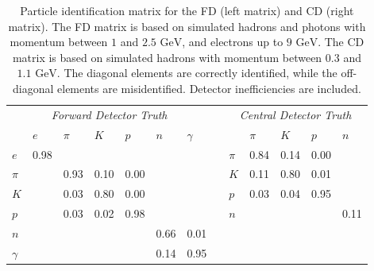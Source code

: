     \begin{table}
        \begin{tabularx}{\textwidth}{XXXXXXXXXXXXX}
            \multicolumn{7}{c}{\textit{Forward Detector Truth}} & & \multicolumn{5}{c}{\textit{Central Detector Truth}}  \\
            \cmidrule{1-7} \cmidrule{9-13}
                     & $e$      & $\pi$ & $K$  & $p$  & $n$  & $\gamma$ & &       & $\pi$    & $K$  & $p$  & $n$  \\
            \cmidrule{1-7} \cmidrule{9-13}
            $e$      & 0.98     &       &      &      &      &          & & $\pi$ & 0.84     & 0.14 & 0.00 &      \\
            $\pi$    &          & 0.93  & 0.10 & 0.00 &      &          & & $K$   & 0.11     & 0.80 & 0.01 &      \\
            $K$      &          & 0.03  & 0.80 & 0.00 &      &          & & $p$   & 0.03     & 0.04 & 0.95 &      \\
            $p$      &          & 0.03  & 0.02 & 0.98 &      &          & & $n$   &          &      &      & 0.11 \\
            \cmidrule{9-13}
            $n$      &          &       &      &      & 0.66 & 0.01     & &       &          &      &      &      \\
            $\gamma$ &          &       &      &      & 0.14 & 0.95     & &       &          &      &      &      \\
            \cmidrule{1-7}
        \end{tabularx}

        \caption[Particle identification matrix.]
        {Particle identification matrix for the FD (left matrix) and CD (right matrix).
        The FD matrix is based on simulated hadrons and photons with momentum between $1$ and $2.5 \text{ GeV}$, and electrons up to $9 \text{ GeV}$.
        The CD matrix is based on simulated hadrons with momentum between $0.3$ and $1.1 \text{ GeV}$.
        The diagonal elements are correctly identified, while the off-diagonal elements are misidentified.
        Detector inefficiencies are included.}
        \label{tab::11.232::reconstruction_pid}
    \end{table}

